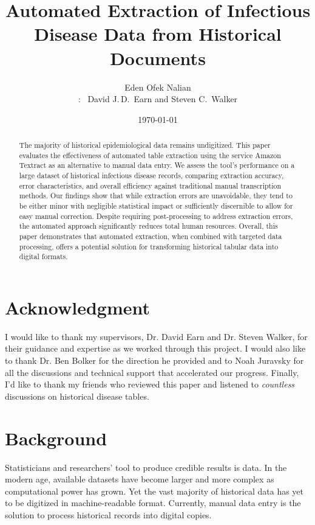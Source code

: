 \documentclass[12pt]{article}
\title{Automated Extraction of Infectious Disease Data from Historical Documents}
\author{Eden Ofek Nalian\\
\small \underline{\smash{Supervisors}}: \ David J.\,D.\ Earn and Steven C.\ Walker}
\date{\today}
\begin{document}
\maketitle

\begin{abstract}
The majority of historical epidemiological data remains undigitized. This paper evaluates the effectiveness of automated table extraction using the service Amazon Textract as an alternative to manual data entry. We assess the tool’s performance on a large dataset of historical infectious disease records, comparing extraction accuracy, error characteristics, and overall efficiency against traditional manual transcription methods. Our findings show that while extraction errors are unavoidable, they tend to be either minor with negligible statistical impact or sufficiently discernible to allow for easy manual correction. Despite requiring post-processing to address extraction errors, the automated approach significantly reduces total human resources. Overall, this paper demonstrates that automated extraction, when combined with targeted data processing, offers a potential solution for transforming historical tabular data into digital formats.
\end{abstract}

\clearpage
\vspace*{0.3\textheight}

\section*{\centering Acknowledgment}

I would like to thank my supervisors, Dr. David Earn and Dr. Steven Walker, for their guidance and expertise as we worked through this project. I would also like to thank Dr. Ben Bolker for the direction he provided and to Noah Juravsky for all the discussions and technical support that accelerated our progress. Finally, I'd like to thank my friends who reviewed this paper and listened to \textit{countless} discussions on historical disease tables.


\newpage
\tableofcontents
\bigskip

\newpage
\section{Background} \label{sec:intro}

Statisticians and researchers' tool to produce credible results is data. In the modern age, available datasets have become larger and more complex as computational power has grown. Yet the vast majority of historical data has yet to be digitized in machine-readable format. Currently, manual data entry is the solution to process historical records into digital copies.
\end{document}
